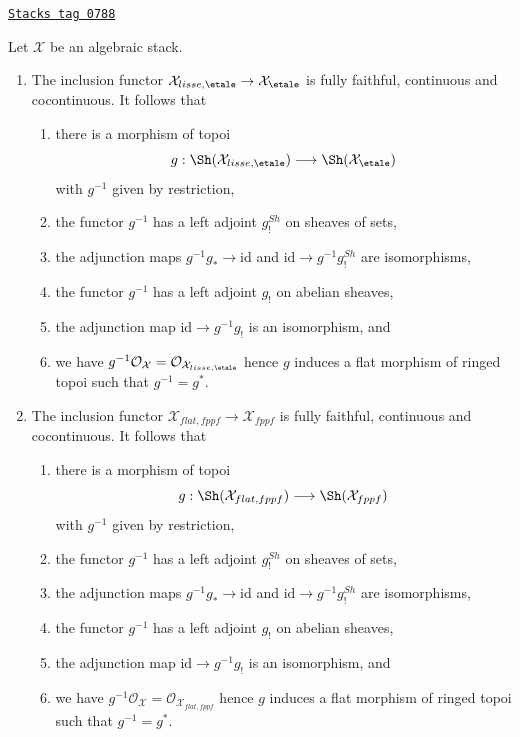\begin{lemma}
\label{stacks-cohomology-lemma-lisse-etale}
\href{https://stacks.math.columbia.edu/tag/0788}{\texttt{Stacks tag 0788}}

Let $\mathcal{X}$ be an algebraic stack.
\begin{enumerate}
\item The inclusion functor
$\mathcal{X}_{lisse,\etale} \to \mathcal{X}_\etale$
is fully faithful, continuous and cocontinuous. It follows that
\begin{enumerate}
\item there is a morphism of topoi
$$
g :
\Sh(\mathcal{X}_{lisse,\etale})
\longrightarrow
\Sh(\mathcal{X}_\etale)
$$
with $g^{-1}$ given by restriction,
\item the functor $g^{-1}$ has a left adjoint $g_!^{Sh}$ on sheaves of sets,
\item the adjunction maps $g^{-1}g_* \to \text{id}$ and
$\text{id} \to g^{-1}g_!^{Sh}$ are isomorphisms,
\item the functor $g^{-1}$ has a left adjoint $g_!$ on abelian sheaves,
\item the adjunction map $\text{id} \to g^{-1}g_!$ is an isomorphism, and
\item we have $g^{-1}\mathcal{O}_\mathcal{X} =
\mathcal{O}_{\mathcal{X}_{lisse,\etale}}$ hence $g$ induces a flat
morphism of ringed topoi such that $g^{-1} = g^*$.
\end{enumerate}
\item The inclusion functor
$\mathcal{X}_{flat,fppf} \to \mathcal{X}_{fppf}$
is fully faithful, continuous and cocontinuous. It follows that
\begin{enumerate}
\item there is a morphism of topoi
$$
g :
\Sh(\mathcal{X}_{flat,fppf})
\longrightarrow
\Sh(\mathcal{X}_{fppf})
$$
with $g^{-1}$ given by restriction,
\item the functor $g^{-1}$ has a left adjoint $g_!^{Sh}$ on sheaves of sets,
\item the adjunction maps $g^{-1}g_* \to \text{id}$ and
$\text{id} \to g^{-1}g_!^{Sh}$ are isomorphisms,
\item the functor $g^{-1}$ has a left adjoint $g_!$ on abelian sheaves,
\item the adjunction map $\text{id} \to g^{-1}g_!$ is an isomorphism, and
\item we have $g^{-1}\mathcal{O}_\mathcal{X} =
\mathcal{O}_{\mathcal{X}_{flat,fppf}}$ hence $g$ induces a flat
morphism of ringed topoi such that $g^{-1} = g^*$.
\end{enumerate}
\end{enumerate}
\end{lemma}

